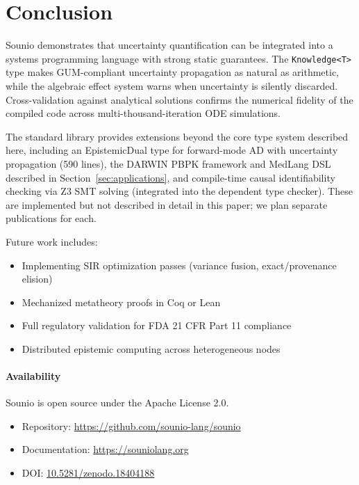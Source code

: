 \documentclass[11pt,a4paper]{article}
\begin{document}
\section{Conclusion}
\label{sec:conclusion}

Sounio demonstrates that uncertainty quantification can be integrated into a
systems programming language with strong static guarantees. The
\texttt{Knowledge<T>} type makes GUM-compliant uncertainty propagation as
natural as arithmetic, while the algebraic effect system warns when
uncertainty is silently discarded. Cross-validation against analytical
solutions confirms the numerical fidelity of the compiled code across
multi-thousand-iteration ODE simulations.

The standard library provides extensions beyond the core type system
described here, including an EpistemicDual type for forward-mode AD with
uncertainty propagation (590 lines), the DARWIN PBPK framework and
MedLang DSL described in Section~\ref{sec:applications}, and compile-time
causal identifiability checking via Z3 SMT solving (integrated into the
dependent type checker). These are implemented but not described in detail
in this paper; we plan separate publications for each.

Future work includes:
\begin{itemize}
  \item Implementing SIR optimization passes (variance fusion, exact/provenance elision)
  \item Mechanized metatheory proofs in Coq or Lean
  \item Full regulatory validation for FDA 21 CFR Part 11 compliance
  \item Distributed epistemic computing across heterogeneous nodes
\end{itemize}

\paragraph{Availability}
Sounio is open source under the Apache License 2.0.
\begin{itemize}
  \item Repository: \url{https://github.com/sounio-lang/sounio}
  \item Documentation: \url{https://souniolang.org}
  \item DOI: \href{https://doi.org/10.5281/zenodo.18404188}{10.5281/zenodo.18404188}
\end{itemize}



\end{document}
